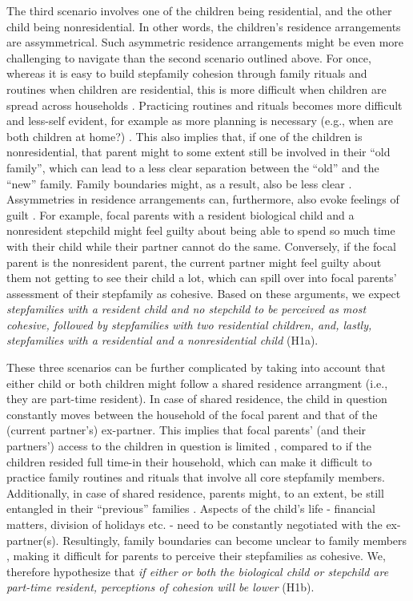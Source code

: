 \documentclass[\pandocDocMode,longtable,floatsintext]{apa6}
\begin{document}
The third scenario involves one of the children being residential, and
the other child being nonresidential. In other words, the children's
residence arrangements are assymmetrical. Such asymmetric residence
arrangements might be even more challenging to navigate than the second
scenario outlined above. For once, whereas it is easy to build
stepfamily cohesion through family rituals and routines when children
are residential, this is more difficult when children are spread across
households \autocite{manning2003complexity}. Practicing routines and
rituals becomes more difficult and less-self evident, for example as
more planning is necessary (e.g., when are both children at home?)
\autocite[ \textcite{schlinzig2019between}]{ambert1986being}. This also
implies that, if one of the children is nonresidential, that parent
might to some extent still be involved in their ``old family'', which
can lead to a less clear separation between the ``old'' and the ``new''
family. Family boundaries might, as a result, also be less clear
\autocite{stewart2005boundary}. Assymmetries in residence arrangements
can, furthermore, also evoke feelings of guilt
\autocite{kalmijn2020guilt}. For example, focal parents with a resident
biological child and a nonresident stepchild might feel guilty about
being able to spend so much time with their child while their partner
cannot do the same. Conversely, if the focal parent is the nonresident
parent, the current partner might feel guilty about them not getting to
see their child a lot, which can spill over into focal parents'
assessment of their stepfamily as cohesive. Based on these arguments, we
expect \emph{stepfamilies with a resident child and no stepchild to be
perceived as most cohesive, followed by stepfamilies with two
residential children, and, lastly, stepfamilies with a residential and a
nonresidential child} (H1a).

These three scenarios can be further complicated by taking into account
that either child or both children might follow a shared residence
arrangment (i.e., they are part-time resident). In case of shared
residence, the child in question constantly moves between the household
of the focal parent and that of the (current partner's) ex-partner. This
implies that focal parents' (and their partners') access to the children
in question is limited \autocite{arat2022parental}, compared to if the
children resided full time-in their household, which can make it
difficult to practice family routines and rituals that involve all core
stepfamily members. Additionally, in case of shared residence, parents
might, to an extent, be still entangled in their ``previous'' families
\autocite{emery1994conceptualizing}. Aspects of the child's life -
financial matters, division of holidays etc. - need to be constantly
negotiated with the ex-partner(s). Resultingly, family boundaries can
become unclear to family members \autocite{zartler2021children}, making
it difficult for parents to perceive their stepfamilies as cohesive. We,
therefore hypothesize that \emph{if either or both the biological child
or stepchild are part-time resident, perceptions of cohesion will be
lower} (H1b).
\end{document}
